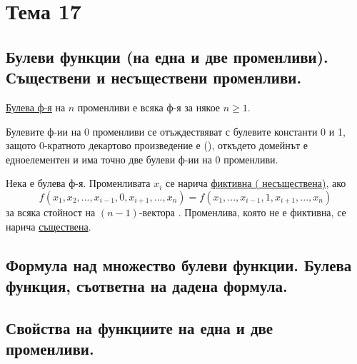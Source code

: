 \section{Тема 17}

\subsection{Булеви функции (на една и две променливи). Съществени и несъществени променливи.}

\begin{note}
\end{note}

\begin{definition}
    \underline{Булева ф-я} на \(n\) променливи е всяка ф-я  за някое \(n \ge 1\).
\end{definition}

Булевите ф-ии на 0 променливи се отъждествяват с булевите константи 0 и 1, защото 0-кратното декартово 
произведение е {()}, откъдето домейнът е едноелементен и има точно две булеви ф-ии на 0 променливи.

\begin{definition}
    Нека  е булева ф-я. Променливата \(x_i\) се нарича \underline{фиктивна (
    несъществена)}, ако
    \begin{equation*}
        f(x_1, x_2, ..., x_{i - 1}, 0, x_{i + 1}, ..., x_n) = f(x_1, ..., x_{i - 1}, 1, x_{i + 1}, ..., x_n)
    \end{equation*}
    за всяка стойност на \((n - 1)\)-вектора .
    Променлива, която не е фиктивна, се нарича \underline{съществена}.
\end{definition}

\subsection{Формула над множество булеви функции. Булева функция, съответна на дадена формула.}



\subsection{Свойства на функциите на една и две променливи.}

